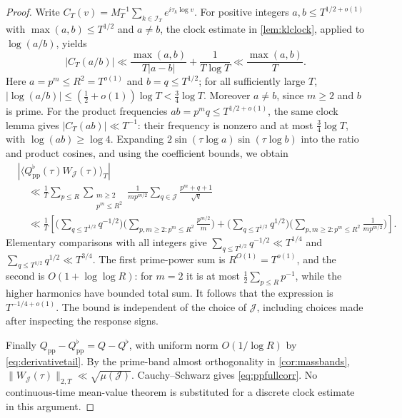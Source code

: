 \documentclass[11pt,reqno]{amsart}
\numberwithin{equation}{section}
\begin{document}
\begin{proof}
Write $C_T(v)=M_T^{-1}\sum_{k\in\mathcal I_T}e^{i\tau_k\log v}$.
For positive integers $a,b\le T^{1/2+o(1)}$ with
$\max(a,b)\le T^{1/2}$ and $a\ne b$, the clock
estimate in \cref{lem:klclock}, applied to
$\log(a/b)$, yields
\begin{equation}\label{eq:clockratioPP}
|C_T(a/b)|\ll\frac{\max(a,b)}{T|a-b|}+\frac1{T\log T}
\ll\frac{\max(a,b)}T.
\end{equation}
Here $a=p^m\le R^2=T^{o(1)}$ and
$b=q\le T^{1/2}$; for all sufficiently large $T$,
$|\log(a/b)|\le(\tfrac12+o(1))\log T<\tfrac34\log T$.
Moreover $a\ne b$, since $m\ge2$ and $b$ is prime.
For the product frequencies $ab=p^mq\le T^{1/2+o(1)}$,
the same clock lemma gives
$|C_T(ab)|\ll T^{-1}$: their frequency is nonzero
and at most $\tfrac34\log T$, with
$\log(ab)\ge\log4$.
Expanding $2\sin(\tau\log a)\sin(\tau\log b)$
into the ratio and product cosines, and using the
coefficient bounds, we obtain
\begin{align*}
&|\langle Q_{\mathrm{pp}}^\flat(\tau)
 W_{\mathcal J}(\tau)\rangle_T|\\
&\quad\ll\frac1T
\sum_{p\le R}\sum_{\substack{m\ge2\\p^m\le R^2}}
\frac1{m p^{m/2}}
\sum_{q\in\mathcal J}\frac{p^m+q+1}{\sqrt q}\\
&\quad\ll\frac1T\left[
\biggl(\sum_{q\le T^{1/2}}q^{-1/2}\biggr)
\biggl(\sum_{p,m\ge2:p^m\le R^2}\frac{p^{m/2}}m\biggr)
+\biggl(\sum_{q\le T^{1/2}}q^{1/2}\biggr)
\biggl(\sum_{p,m\ge2:p^m\le R^2}\frac1{mp^{m/2}}\biggr)
\right].
\end{align*}
Elementary comparisons with all integers give
$\sum_{q\le T^{1/2}}q^{-1/2}\ll T^{1/4}$
and $\sum_{q\le T^{1/2}}q^{1/2}\ll T^{3/4}$.
The first prime-power sum is $R^{O(1)}=T^{o(1)}$,
and the second is $O(1+\log\log R)$:
for $m=2$ it is at most $\frac12\sum_{p\le R}p^{-1}$,
while the higher harmonics have bounded total sum.
It follows that the expression is $T^{-1/4+o(1)}$.
The bound is independent of the choice of $\mathcal J$,
including choices made after inspecting the response signs.

Finally $Q_{\mathrm{pp}}-Q_{\mathrm{pp}}^\flat=Q-Q^\flat$,
with uniform norm $O(1/\log R)$ by \eqref{eq:derivativetail}.
By the prime-band almost orthogonality in
\cref{cor:massbands},
$\|W_{\mathcal J}(\tau)\|_{2,T}\ll\sqrt{\mu(\mathcal J)}$.
Cauchy--Schwarz gives \eqref{eq:ppfullcorr}. No
continuous-time mean-value theorem is substituted for
a discrete clock estimate in this argument.
\end{proof}
\end{document}
